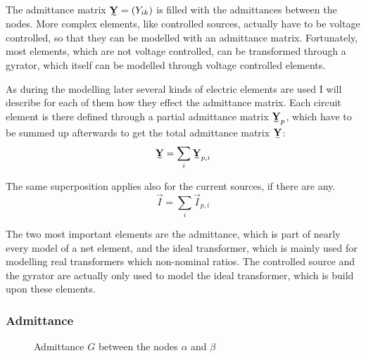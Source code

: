 The admittance matrix $\mat Y = (Y_{ik})$ is filled with the admittances between the nodes. More complex elements, like controlled sources, actually have to be voltage controlled, so that they can be modelled with an admittance matrix. Fortunately, most elements, which are not voltage controlled, can be transformed through a gyrator, which itself can be modelled through voltage controlled elements.

As during the modelling later several kinds of electric elements are used I will describe for each of them how they effect the admittance matrix. Each circuit element is there defined through a partial admittance matrix $\mat Y_p$, which have to be summed up afterwards to get the total admittance matrix $\mat Y$:
\begin{equation}
	\mat Y = \sum_i \mat Y_{p,i}
\end{equation}

The same superposition applies also for the current sources, if there are any.
\begin{equation}
	\vec I = \sum_i \vec I_{p,i}
\end{equation}

The two most important elements are the admittance, which is part of nearly every model of a net element, and the ideal transformer, which is mainly used for modelling real transformers which non-nominal ratios. The controlled source and the gyrator are actually only used to model the ideal transformer, which is build upon these elements.

\subsubsection{Admittance}

\begin{figure}
	\centering
	
	\caption{Admittance $G$ between the nodes $\alpha$ and $\beta$}
	\label{fig:admittance}
\end{figure}

